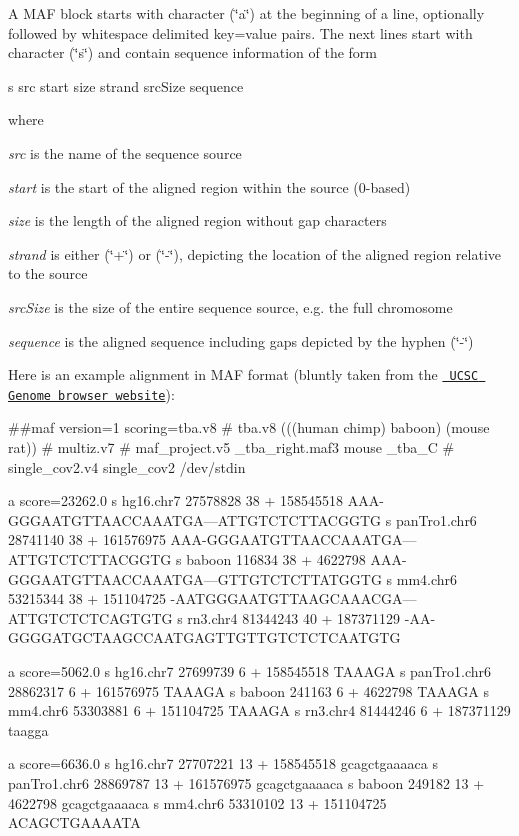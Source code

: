A M\+AF block starts with character (\char`\"{}a\char`\"{}) at the beginning of a line, optionally followed by whitespace delimited key=value pairs. The next lines start with character (\char`\"{}s\char`\"{}) and contain sequence information of the form \begin{DoxyVerb}s src start size strand srcSize sequence
\end{DoxyVerb}
 where
\begin{DoxyItemize}
\item {\itshape src} is the name of the sequence source
\item {\itshape start} is the start of the aligned region within the source (0-\/based)
\item {\itshape size} is the length of the aligned region without gap characters
\item {\itshape strand} is either (\char`\"{}+\char`\"{}) or (\char`\"{}-\/\char`\"{}), depicting the location of the aligned region relative to the source
\item {\itshape src\+Size} is the size of the entire sequence source, e.\+g. the full chromosome
\item {\itshape sequence} is the aligned sequence including gaps depicted by the hyphen (\char`\"{}-\/\char`\"{})
\end{DoxyItemize}Here is an example alignment in M\+AF format (bluntly taken from the \href{https://cgwb.nci.nih.gov/FAQ/FAQformat.html\#format5}{\texttt{ U\+C\+SC Genome browser website}})\+: 
\begin{DoxyVerbInclude}
##maf version=1 scoring=tba.v8 
# tba.v8 (((human chimp) baboon) (mouse rat)) 
# multiz.v7
# maf_project.v5 _tba_right.maf3 mouse _tba_C
# single_cov2.v4 single_cov2 /dev/stdin
                   
a score=23262.0     
s hg16.chr7    27578828 38 + 158545518 AAA-GGGAATGTTAACCAAATGA---ATTGTCTCTTACGGTG
s panTro1.chr6 28741140 38 + 161576975 AAA-GGGAATGTTAACCAAATGA---ATTGTCTCTTACGGTG
s baboon         116834 38 +   4622798 AAA-GGGAATGTTAACCAAATGA---GTTGTCTCTTATGGTG
s mm4.chr6     53215344 38 + 151104725 -AATGGGAATGTTAAGCAAACGA---ATTGTCTCTCAGTGTG
s rn3.chr4     81344243 40 + 187371129 -AA-GGGGATGCTAAGCCAATGAGTTGTTGTCTCTCAATGTG
                   
a score=5062.0                    
s hg16.chr7    27699739 6 + 158545518 TAAAGA
s panTro1.chr6 28862317 6 + 161576975 TAAAGA
s baboon         241163 6 +   4622798 TAAAGA 
s mm4.chr6     53303881 6 + 151104725 TAAAGA
s rn3.chr4     81444246 6 + 187371129 taagga

a score=6636.0
s hg16.chr7    27707221 13 + 158545518 gcagctgaaaaca
s panTro1.chr6 28869787 13 + 161576975 gcagctgaaaaca
s baboon         249182 13 +   4622798 gcagctgaaaaca
s mm4.chr6     53310102 13 + 151104725 ACAGCTGAAAATA

\end{DoxyVerbInclude}
